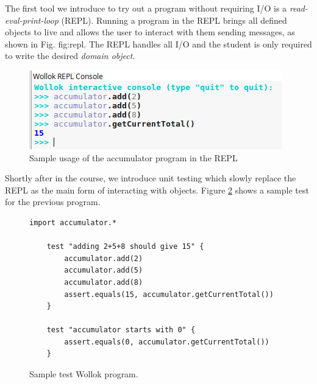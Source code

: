 The first tool we introduce to try out a program without requiring I/O is a \emph {read-eval-print-loop} (REPL). Running a program in the REPL brings all defined objects to live and allows the user to interact with them sending messages, as shown in Fig. {fig:repl}. 
The REPL handles all I/O and the student is only required to write the desired \emph{domain object}.

\begin{figure}[ht]
 \centering
 \includegraphics[scale=0.6]{images/accumulator-repl.png}
 \caption{\small Sample usage of the accumulator program in the REPL}
 \label{fig:repl}
\end{figure}




Shortly after in the course, we introduce unit testing which slowly replace the REPL as the main form of interacting with objects. Figure \ref{fig:test} shows a sample test for the previous program. 

\begin{figure}[ht]
 \centering
 \begin{lstlisting}[language=Wollok]
 	import accumulator.*

	test "adding 2+5+8 should give 15" {
		accumulator.add(2)
		accumulator.add(5)
		accumulator.add(8)
		assert.equals(15, accumulator.getCurrentTotal())		
	}
   
	test "accumulator starts with 0" {
		assert.equals(0, accumulator.getCurrentTotal())
	}
 \end{lstlisting}
 
 \caption{\small Sample test Wollok program.}
 \label{fig:test}
\end{figure}

